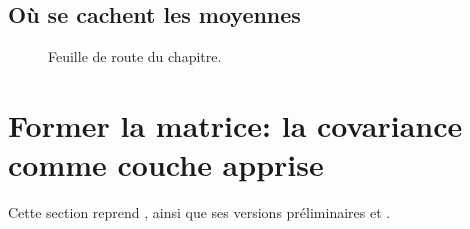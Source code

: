 \subsection{Où se cachent les moyennes}
\label{sec:spdnet-feuille-route}

\begin{figure}[htb]
  \begin{center}
    \makebox[\textwidth][c]{}
  \end{center}
  \caption{Feuille de route du chapitre. %
  }
  \label{fig:spdnet-feuille-route}
\end{figure}



\section{Former la matrice: la covariance comme couche apprise}
\label{sec:spdnet-covpool}

\begin{contributions}
  Cette section reprend , ainsi que ses versions préliminaires
   et .
\end{contributions}

